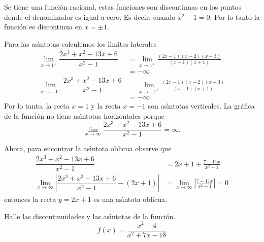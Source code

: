 \begin{sol}
Se tiene una funci\'{o}n racional, estas funciones son discontinuas en los
puntos donde el denominador es igual a cero. Es decir, cuando $x^{2}-1=0$. Por
lo tanto la funci\'{o}n es discontinua en $x=\pm1.$

Para las as\'{\i}ntotas calculemos los l\'{\i}mites laterales
\begin{align*}
\lim\limits_{x\rightarrow1^{+}}\dfrac{2x^{3}+x^{2}-13x+6}{x^{2}-1}  &
=\lim\limits_{x\rightarrow1^{+}}\frac{\left(  2x-1\right)  \left(  x-2\right)
\left(  x+3\right)  }{(x-1)(x+1)}\\
&  =-\infty\\
\lim\limits_{x\rightarrow-1^{+}}\dfrac{2x^{3}+x^{2}-13x+6}{x^{2}-1}  &
=\lim\limits_{x\rightarrow-1^{+}}\frac{\left(  2x-1\right)  \left(
x-2\right)  \left(  x+3\right)  }{(x-1)(x+1)}\\
&  =-\infty.
\end{align*}
Por lo tanto, la recta $x=1$ y la recta $x=-1$ son as\'{\i}ntotas verticales.
La gr\'{a}fica de la funci\'{o}n no tiene as\'{\i}ntotas horizontales porque%
\[
\lim\limits_{x\rightarrow\infty}\dfrac{2x^{3}+x^{2}-13x+6}{x^{2}-1}=\infty.
\]


Ahora, para encontrar la as\'{\i}ntota oblicua observe que
\begin{align*}
\dfrac{2x^{3}+x^{2}-13x+6}{x^{2}-1}  &  =2x+1+\frac{7-11x}{x^{2}-1}\\
\lim\limits_{x\rightarrow\infty}\left|  \dfrac{2x^{3}+x^{2}-13x+6}{x^{2}%
-1}-\left(  2x+1\right)  \right|   &  =\lim\limits_{x\rightarrow\infty}\left|
\frac{7-11x}{x^{2}-1}\right|  =0
\end{align*}
entonces la recta $y=2x+1$ es una as\'{\i}ntota oblicua.
\end{sol}

\begin{example}
\label{a9}Halle las discontinuidades y las as\'{\i}ntotas de la funci\'{o}n.
\[
f(x)=\dfrac{x^{2}-4}{x^{2}+7x-18}%
\]

\end{example}

